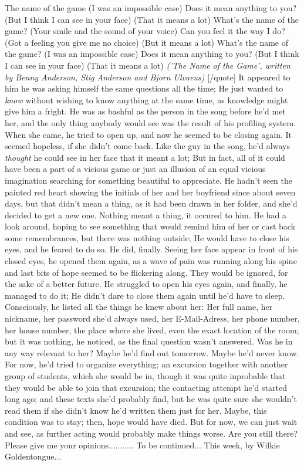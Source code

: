 The name of the game (I was an impossible case) 
Does it mean anything to you? (But I think I can see in your face) 
(That it means a lot) 
What's the name of the game? (Your smile and the sound of your voice) 
Can you feel it the way I do? (Got a feeling you give me no choice) 
(But it means a lot) 
What's the name of the game? (I was an impossible case) 
Does it mean anything to you? (But I think I can see in your face) 
(That it means a lot) 
\emph{('The Name of the Game', written by Benny Anderson, Stig Anderson and Bjorn Ulvaeus)}
[/quote]
It appeared to him he was asking himself the same questions all the time; He just wanted to \emph{know} without wishing to know anything at the same time, as knowledge might give him a fright. 
He was as bashful as the person in the song before he'd met her, and the only thing anybody would see was the result of his profiling system. When she came, he tried to open up, and now he seemed to be closing again. 
It seemed hopeless, if she didn't come back. 
Like the guy in the song, he'd always \emph{thought} he could see in her face that it meant a lot; But in fact, all of it could have been a part of a vicious game or just an illusion of an equal vicious imagination searching for something beautiful to appreciate. 
He hadn't seen the painted red heart showing the initials of her and her boyfriend since about seven days, but that didn't mean a thing, as it had been drawn in her folder, and she'd decided to get a new one. 
Nothing meant a thing, it occured to him. 
He had a look around, hoping to see something that would remind him of her or cast back some remembrances, but there was nothing outside; He would have to close his eyes, and he feared to do so. 
He did, finally. Seeing her face appear in front of his closed eyes, he opened them again, as a wave of pain was running along his spine and last bits of hope seemed to be flickering along. 
They would be ignored, for the sake of a better future. 
He struggled to open his eyes again, and finally, he managed to do it; He didn't dare to close them again until he'd have to sleep. 
Consciously, he listed all the things he knew about her: Her full name, her nickname, her password she'd always used, her E-Mail-Adress, her phone number, her house number, the place where she lived, even the exact location of the room; but it was nothing, he noticed, as the final question wasn't answered. 
Was he in any way relevant to her?
Maybe he'd find out tomorrow. 
Maybe he'd never know. 
For now, he'd tried to organize everything; an excursion together with another group of students, which she would be in, though it was quite inprobable that they would be able to join that excursion; the contacting attempt he'd started long ago; and these texts she'd probably find, but he was quite sure she wouldn't read them if she didn't know he'd written them just for her. 
Maybe, this condition was to stay; then, hope would have died. 
But for now, we can just wait and see, as further acting would probably make things worse. 
Are you still there? Please give me your opinions...........
To be continued...
This week, by Wilkie Goldentongue...

